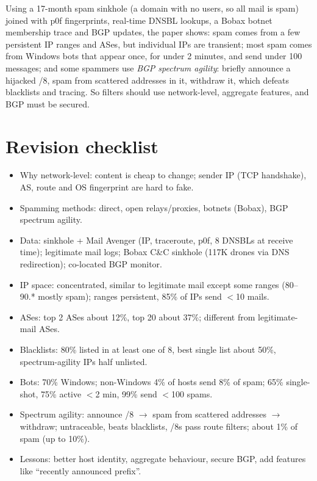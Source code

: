 \begin{keybox}
Using a 17-month spam sinkhole (a domain with no users, so all mail is spam) joined with p0f fingerprints, real-time DNSBL lookups, a Bobax botnet
membership trace and BGP updates, the paper shows: spam comes from a few persistent IP ranges and ASes, but individual IPs are transient; most spam comes
from Windows bots that appear once, for under 2 minutes, and send under 100 messages; and some spammers use \emph{BGP spectrum agility}: briefly announce
a hijacked /8, spam from scattered addresses in it, withdraw it, which defeats blacklists and tracing. So filters should use network-level, aggregate
features, and BGP must be secured.
\end{keybox}

\section{Revision checklist}
\begin{itemize}
  \item Why network-level: content is cheap to change; sender IP (TCP handshake), AS, route and OS fingerprint are hard to fake.
  \item Spamming methods: direct, open relays/proxies, botnets (Bobax), BGP spectrum agility.
  \item Data: sinkhole + Mail Avenger (IP, traceroute, p0f, 8 DNSBLs at receive time); legitimate mail logs; Bobax C\&C sinkhole (117K drones via DNS redirection); co-located BGP monitor.
  \item IP space: concentrated, similar to legitimate mail except some ranges (80--90.* mostly spam); ranges persistent, 85\% of IPs send $<$10 mails.
  \item ASes: top 2 ASes about 12\%, top 20 about 37\%; different from legitimate-mail ASes.
  \item Blacklists: 80\% listed in at least one of 8, best single list about 50\%, spectrum-agility IPs half unlisted.
  \item Bots: 70\% Windows; non-Windows 4\% of hosts send 8\% of spam; 65\% single-shot, 75\% active $<$2 min, 99\% send $<$100 spams.
  \item Spectrum agility: announce /8 $\to$ spam from scattered addresses $\to$ withdraw; untraceable, beats blacklists, /8s pass route filters; about 1\% of spam (up to 10\%).
  \item Lessons: better host identity, aggregate behaviour, secure BGP, add features like ``recently announced prefix''.
\end{itemize}
